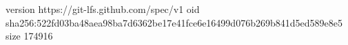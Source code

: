 version https://git-lfs.github.com/spec/v1
oid sha256:522fd03ba48aea98ba7d6362be17e41fce6e16499d076b269b841d5ed589e8e5
size 174916
